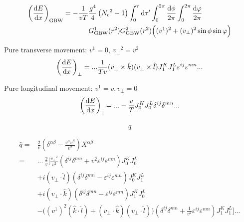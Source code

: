 \begin{equation*}
\begin{split}
\left(\frac{\mathop{}\!\mathrm{d} E}{\mathop{}\!\mathrm{d} x}  \right)_{\text{GBW}}  = - \frac{1}{vT} & \frac{g^4}{4}\left({N_c}^2-1 \right)
\int_0^\tau \mathop{}\!\mathrm{d} \tau' \int_0^{2\pi} \frac{\mathop{}\!\mathrm{d} \phi}{2\pi} \int_0^{2\pi} \frac{\mathop{}\!\mathrm{d} \varphi}{2\pi} \\  & G^1_\text{GBW}(r^2) G^2_\text{GBW}(r^2)
\Big( (v^1)^2 + (v_\perp)^2 \sin \phi \sin \varphi \Big) 
\end{split}
\end{equation*}


Pure transverse movement: $v^1 = 0, ~ {v_\perp}^2 = v^2$
\begin{equation*}
\begin{split}
\left( \frac{\mathop{}\!\mathrm{d} E}{\mathop{}\!\mathrm{d} x} \right)_\perp = ... \frac{1}{Tv} (v_\perp \times \hat{k})(v_\perp \times \hat{l}) J_1^K J_1^L  \varepsilon^{ij} \varepsilon^{mn} ...
\end{split}
\end{equation*}

Pure longitudinal movement: $v^1 = v, v_\perp=0$
\begin{equation*}
\left(\frac{\mathop{}\!\mathrm{d} E}{\mathop{}\!\mathrm{d} x} \right)_\parallel = ... -\frac{v}{T} J_0^K J_0^L \delta^{ij} \delta^{mn} ...
\end{equation*}

\newpage

$$\hat{q} $$

\begin{equation*}
\begin{split}
\hat{q} = & \frac{2}{v} \left( \delta^{\alpha \beta} - \frac{v^\alpha v^\beta}{v^2} \right) X^{\alpha \beta} \\
= & ...~ \frac{2}{v} \Bigg[\frac{{v_\perp}^2}{v^2} \left( \delta^{ij} \delta^{mn} + v^2 \varepsilon^{ij} \varepsilon^{mn} \right) J_0 ^K J_0^L \\
& + i (v_\perp \cdot \hat{l}) (\delta^{ij} \delta^{mn} - \varepsilon^{ij} \varepsilon^{mn}) J_0 ^K J_1^L \\
& + i (v_\perp \cdot \hat{k}) (\delta^{ij} \delta^{mn} - \varepsilon^{ij} \varepsilon^{mn}) J_1 ^K J_0^L \\
& -  \Big( (v^1)^2 (\hat{k} \cdot \hat{l}) +(v_\perp \cdot \hat{k}) (v_\perp \cdot \hat{l}) \Big) \left( \delta^{ij} \delta^{mn} + \frac{1}{v^2} \varepsilon^{ij}\varepsilon^{mn} \right)  J_1 ^K J_1^L \Bigg] ...
\end{split}
\end{equation*}

